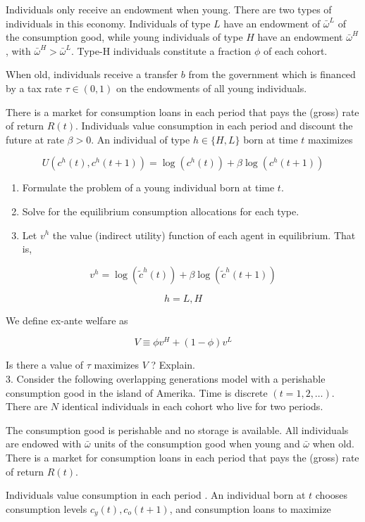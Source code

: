 \documentclass[10pt]{article}
\begin{document}
Individuals only receive an endowment when young. There are two types of individuals in this economy. Individuals of type $L$ have an endowment of $\bar{\omega}^{L}$ of the consumption good, while young individuals of type $H$ have an endowment $\bar{\omega}^{H}$, with $\bar{\omega}^{H}>\bar{\omega}^{L}$. Type-H individuals constitute a fraction $\phi$ of each cohort.

When old, individuals receive a transfer $b$ from the government which is financed by a tax rate $\tau \in(0,1)$ on the endowments of all young individuals.

There is a market for consumption loans in each period that pays the (gross) rate of return $R(t)$. Individuals value consumption in each period and discount the future at rate $\beta>0$. An individual of type $h \in\{H, L\}$ born at time $t$ maximizes

$$
U\left(c^{h}(t), c^{h}(t+1)\right)=\log \left(c^{h}(t)\right)+\beta \log \left(c^{h}(t+1)\right)
$$

\begin{enumerate}
  \item Formulate the problem of a young individual born at time $t$.
  \item Solve for the equilibrium consumption allocations for each type.
  \item Let $v^{h}$ the value (indirect utility) function of each agent in equilibrium. That is,
\end{enumerate}

$$
v^{h}=\log \left(\tilde{c}^{h}(t)\right)+\beta \log \left(\tilde{c}^{h}(t+1)\right)
$$

$$
h=L, H
$$

We define ex-ante welfare as

$$
V \equiv \phi v^{H}+(1-\phi) v^{L}
$$

Is there a value of $\tau$ maximizes $V$ ? Explain.\\
3. Consider the following overlapping generations model with a perishable consumption good in the island of Amerika. Time is discrete $(t=1,2, \ldots)$. There are $N$ identical individuals in each cohort who live for two periods.

The consumption good is perishable and no storage is available. All individuals are endowed with $\bar{\omega}$ units of the consumption good when young and $\bar{\omega}$ when old. There is a market for consumption loans in each period that pays the (gross) rate of return $R(t)$.

Individuals value consumption in each period . An individual born at $t$ chooses consumption levels $c_{y}(t), c_{o}(t+1)$, and consumption loans to maximize
\end{document}
